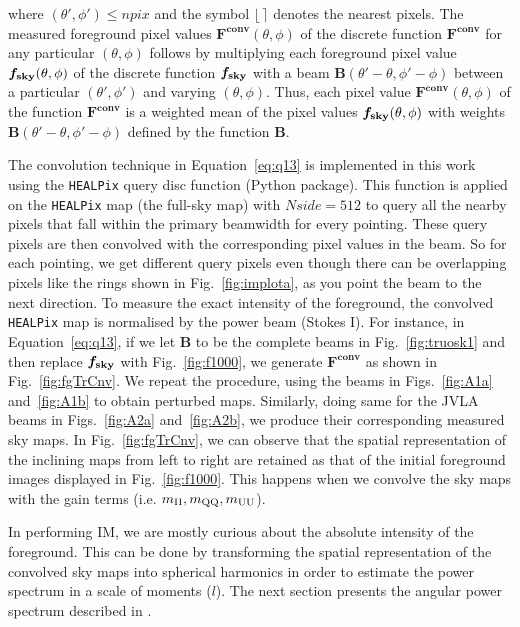 \noindent where  $ (\theta', \phi') \leq npix$ and the symbol $\lfloor \, \rceil$ denotes the nearest pixels. The measured foreground
pixel values $\bm{ F^{conv}}(\theta, \phi)$ of the discrete function $\bm{F^{conv}}$ for any particular $ (\theta, \phi)$ follows by 
multiplying each foreground pixel value $\boldsymbol{f_{\rm sky}}(\theta, \phi)$ of the discrete function $\boldsymbol{f_{\rm sky}}$ with a beam  $\bm{B}(\theta' - \theta, \phi' - \phi)$
between a particular $ (\theta', \phi')$ and varying $(\theta, \phi)$. Thus, each pixel value $\bm{ F^{conv}}(\theta, \phi)$ of the function $\bm{F^{conv}}$ is 
a weighted mean of the pixel values $\boldsymbol{f_{\rm sky}}(\theta, \phi)$ with weights $\bm{B}(\theta' - \theta, \phi' - \phi)$ defined by the function $\bm{B}$.

The convolution technique in Equation~\ref{eq:q13} is implemented in this work using the {\tt HEALPix} query disc function (Python package). 
This function is applied on the {\tt HEALPix} map (the full-sky map) with $Nside = 512$ to query all the nearby pixels that fall within the primary beamwidth for every pointing.
These query pixels are then convolved with the corresponding pixel values in the beam. So for each pointing, we get different query pixels even though there can be overlapping pixels
like the rings shown in Fig.~\ref{fig:implota}, as you point the beam to the next direction. To measure the exact intensity of the foreground, the convolved {\tt HEALPix} map is normalised by the power beam (Stokes I). For instance, in Equation~\ref{eq:q13}, if we let $\bm{B}$ to be the complete beams in Fig.~\ref{fig:truosk1}  and then replace $\boldsymbol{f_{\rm sky}}$ with Fig.~\ref{fig:f1000}, we generate $\bm{ F^{conv}}$ as shown in Fig.~\ref{fig:fgTrCnv}. We repeat the procedure, using the beams in Figs.~\ref{fig:A1a} and~\ref{fig:A1b} to obtain perturbed maps.  Similarly, doing same for the JVLA beams in Figs.~\ref{fig:A2a} and~\ref{fig:A2b}, we produce their corresponding  measured sky maps. In Fig.~\ref{fig:fgTrCnv}, we can observe that the spatial representation of the inclining maps from left to right are retained as that of the initial foreground images displayed in Fig.~\ref{fig:f1000}. This happens when we convolve the sky maps with the gain terms (i.e. $m_{\rm II}, m_{\rm QQ}, m_{\rm UU}$).


In performing IM,  we are mostly curious about the absolute intensity of the foreground. This can be done by transforming the spatial representation of the convolved sky maps 
into spherical harmonics in order to estimate the power spectrum in a scale of moments ($l$). The next section presents the angular power spectrum described in \citep{ansah2018simulations}.

